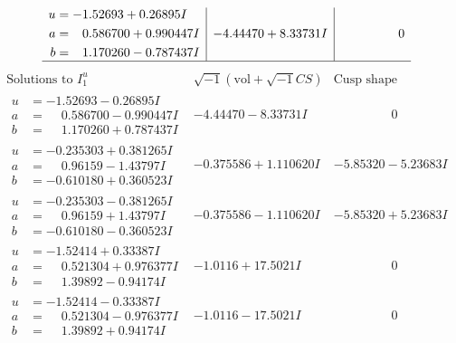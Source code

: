 \documentclass[1p]{elsarticle_modified}
\theoremstyle{definition}
\newcommand{\I}{\sqrt{-1}}
\begin{document}
$$\begin{array}{c|c|c}
\begin{aligned}
u &= -1.52693 + 0.26895 I \\
a &= \phantom{-}0.586700 + 0.990447 I \\
b &= \phantom{-}1.170260 - 0.787437 I\end{aligned}
 & -4.44470 + 8.33731 I & \phantom{-0.000000 } 0\\
 \hline 
 \end{array}$$\newpage$$\begin{array}{c|c|c}  
\text{Solutions to }I^u_{1}& \I (\text{vol} + \sqrt{-1}CS) & \text{Cusp shape}\\
 \hline 
\begin{aligned}
u &= -1.52693 - 0.26895 I \\
a &= \phantom{-}0.586700 - 0.990447 I \\
b &= \phantom{-}1.170260 + 0.787437 I\end{aligned}
 & -4.44470 - 8.33731 I & \phantom{-0.000000 } 0 \\ \hline\begin{aligned}
u &= -0.235303 + 0.381265 I \\
a &= \phantom{-}0.96159 - 1.43797 I \\
b &= -0.610180 + 0.360523 I\end{aligned}
 & -0.375586 + 1.110620 I & -5.85320 - 5.23683 I \\ \hline\begin{aligned}
u &= -0.235303 - 0.381265 I \\
a &= \phantom{-}0.96159 + 1.43797 I \\
b &= -0.610180 - 0.360523 I\end{aligned}
 & -0.375586 - 1.110620 I & -5.85320 + 5.23683 I \\ \hline\begin{aligned}
u &= -1.52414 + 0.33387 I \\
a &= \phantom{-}0.521304 + 0.976377 I \\
b &= \phantom{-}1.39892 - 0.94174 I\end{aligned}
 & -1.0116 + 17.5021 I & \phantom{-0.000000 } 0 \\ \hline\begin{aligned}
u &= -1.52414 - 0.33387 I \\
a &= \phantom{-}0.521304 - 0.976377 I \\
b &= \phantom{-}1.39892 + 0.94174 I\end{aligned}
 & -1.0116 - 17.5021 I & \phantom{-0.000000 } 0 \\ \hline\begin{aligned}

\end{aligned}
\end{array}$$
\end{document}

